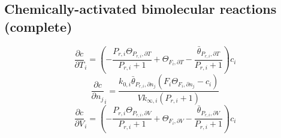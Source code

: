 \documentclass[a4paper,10pt]{article}
\begin{document}
\subsection{Chemically-activated bimolecular reactions (complete)}
\begin{dmath} \frac{\partial c }{\partial T }_{i} = \left(- \frac{P_{r, i} \Theta_{P_{r,i}, \partial T}}{P_{r, i} + 1} + \Theta_{F_i, \partial T} - \frac{\bar{\theta}_{P_{r, i}, \partial T}}{P_{r, i} + 1}\right) c_{i}\end{dmath} 
\begin{dmath} \frac{\partial c }{\partial {n_j} }_{i} = \frac{k_{0, i} \bar{\theta}_{P_{r, i}, \partial n_j} \left(F_{i} \Theta_{F_i, \partial n_j} - c_{i}\right)}{V k_{\infty, i} \left(P_{r, i} + 1\right)}\end{dmath} 
\begin{dmath} \frac{\partial c }{\partial V }_{i} = \left(- \frac{P_{r, i} \Theta_{P_{r,i}, \partial V}}{P_{r, i} + 1} + \Theta_{F_i, \partial V} - \frac{\bar{\theta}_{P_{r, i}, \partial V}}{P_{r, i} + 1}\right) c_{i}\end{dmath} 
\end{document}
